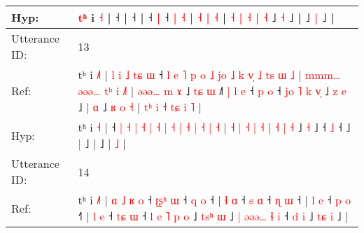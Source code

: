 \documentclass[10pt]{article}
\DeclareRobustCommand{\hl}[1]{{\textcolor{red}{#1}}}
\begin{document}
\begin{longtable}{ll}
 \\
Hyp: & \hl{}\hl{}\hl{}\hl{}\hl{}\hl{}\hl{}\hl{}\hl{}\hl{}\hl{}\hl{}\hl{}\hl{}\hl{}\hl{}\hl{}\hl{t}\hl{ʰ} i\hl{} \hl{˧} |\hl{}\hl{}\hl{}\hl{} ˧\hl{}\hl{}\hl{}\hl{}\hl{}\hl{}\hl{} |\hl{}\hl{}\hl{}\hl{}\hl{} ˧\hl{}\hl{}\hl{}\hl{}\hl{}\hl{}\hl{}\hl{}\hl{}\hl{}\hl{}\hl{}\hl{}\hl{}\hl{}\hl{}\hl{}\hl{}\hl{}\hl{}\hl{} |\hl{}\hl{} ˧\hl{}\hl{} \hl{|} ˧ \hl{|} \hl{˧} \hl{|} \hl{˧} \hl{|} \hl{˧} | \hl{˧} \hl{|} \hl{˧} \hl{|} \hl{˧} ˩\hl{}\hl{} \hl{˧} ˩\hl{}\hl{}\hl{}\hl{}\hl{}\hl{}\hl{} |\hl{}\hl{}\hl{}\hl{}\hl{}\hl{}\hl{}\hl{}\hl{}\hl{}\hl{} ˩\hl{}\hl{} \hl{|} ˩ |
 \\
\midrule
Utterance ID: & 13 \\
Ref: & tʰ i \hl{˩}\hl{˥} |\hl{ }\hl{l}\hl{ }\hl{i}\hl{ }\hl{˩}\hl{ }\hl{t}\hl{ɕ}\hl{ }\hl{ɯ} ˧ \hl{l} \hl{e} \hl{˥} \hl{p} \hl{o} \hl{˩} \hl{j}\hl{o} \hl{˩} \hl{k} \hl{v}\hl{̩} \hl{˩} \hl{t}\hl{s} \hl{ɯ} \hl{˩} | \hl{m}\hl{m}\hl{m}\hl{…} \hl{ə}\hl{ə}\hl{ə}\hl{…} \hl{t}\hl{ʰ} \hl{i} \hl{˩}\hl{˥} | \hl{ə}\hl{ə}\hl{ə}\hl{…} \hl{m} \hl{ɤ} ˩\hl{ }\hl{t}\hl{ɕ} \hl{ɯ} ˩\hl{˥}\hl{ }\hl{|}\hl{ }\hl{l}\hl{ }\hl{e} ˧\hl{ }\hl{p} \hl{o} ˧\hl{ }\hl{j}\hl{o}\hl{ }\hl{˥}\hl{ }\hl{k}\hl{ }\hl{v}\hl{̩} ˩\hl{ }\hl{z} \hl{e} ˩ |\hl{ }\hl{ɑ} ˩\hl{ }\hl{ʁ}\hl{ }\hl{o}\hl{ }\hl{˧} |\hl{ }\hl{t}\hl{ʰ}\hl{ }\hl{i}\hl{ }\hl{˧}\hl{ }\hl{t}\hl{ɕ}\hl{ }\hl{i} \hl{˥} |
 \\
Hyp: & tʰ i \hl{}\hl{˧} |\hl{}\hl{}\hl{}\hl{}\hl{}\hl{}\hl{}\hl{}\hl{}\hl{}\hl{} ˧ \hl{|} \hl{˧} \hl{|} \hl{˧} \hl{|} \hl{˧} \hl{}\hl{|} \hl{˧} \hl{|} \hl{}\hl{˧} \hl{|} \hl{}\hl{˧} \hl{|} \hl{˧} | \hl{}\hl{}\hl{}\hl{˧} \hl{}\hl{}\hl{}\hl{|} \hl{}\hl{˧} \hl{|} \hl{}\hl{˧} | \hl{}\hl{}\hl{}\hl{˧} \hl{|} \hl{˧} ˩\hl{}\hl{}\hl{} \hl{˧} ˩\hl{}\hl{}\hl{}\hl{}\hl{}\hl{}\hl{} ˧\hl{}\hl{} \hl{˩} ˧\hl{}\hl{}\hl{}\hl{}\hl{}\hl{}\hl{}\hl{}\hl{}\hl{} ˩\hl{}\hl{} \hl{|} ˩ |\hl{}\hl{} ˩\hl{}\hl{}\hl{}\hl{}\hl{}\hl{} |\hl{}\hl{}\hl{}\hl{}\hl{}\hl{}\hl{}\hl{}\hl{}\hl{}\hl{}\hl{} \hl{˩} |
 \\
\midrule
Utterance ID: & 14 \\
Ref: & tʰ i \hl{˩}\hl{˥} |\hl{ }\hl{ɑ}\hl{ }\hl{˩}\hl{ }\hl{ʁ}\hl{ }\hl{o} ˧\hl{ }\hl{ʈ}\hl{ʂ}\hl{ʰ} \hl{ɯ} ˧\hl{ }\hl{q} \hl{o} ˧ |\hl{ }\hl{ɬ}\hl{ }\hl{ɑ} ˧\hl{ }\hl{s} \hl{ɑ} ˧\hl{ }\hl{ɳ} \hl{ɯ} ˧ |\hl{ }\hl{l}\hl{ }\hl{e} ˧\hl{ }\hl{p} \hl{o} ˧\hl{˥} |\hl{ }\hl{l}\hl{ }\hl{e} ˧\hl{ }\hl{t}\hl{ɕ} \hl{ɯ} ˧\hl{ }\hl{l}\hl{ }\hl{e}\hl{ }\hl{˥}\hl{ }\hl{p}\hl{ }\hl{o} ˩\hl{ }\hl{t}\hl{s}\hl{ʰ} \hl{ɯ} ˩\hl{ }\hl{|}\hl{ }\hl{ə}\hl{ə}\hl{ə}\hl{…} \hl{ɬ} \hl{i} ˧ \hl{d} \hl{i} ˩\hl{ }\hl{t}\hl{ɕ} \hl{i} ˩ |

\end{longtable}
\end{document}

